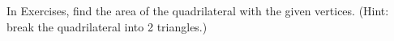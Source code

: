 \begin{exerciseset}{In Exercises}{, find the area of the quadrilateral with the given vertices. (Hint: break the quadrilateral into 2 triangles.)}



\end{exerciseset}
